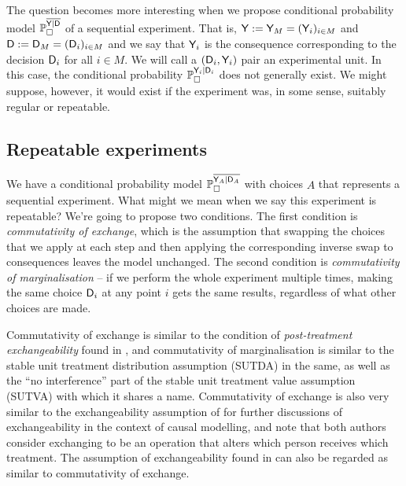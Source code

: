 The question becomes more interesting when we propose conditional probability model $\mathbb{P}_\square^{\overline{\mathsf{Y}|\mathsf{D}}}$ of a sequential experiment. That is, $\mathsf{Y}:=\mathsf{Y}_M=(\mathsf{Y}_i)_{i\in M}$ and $\mathsf{D}:=\mathsf{D}_M=(\mathsf{D}_i)_{i\in M}$ and we say that $\mathsf{Y}_i$ is the consequence corresponding to the decision $\mathsf{D}_i$ for all $i\in M$. We will call a $(\mathsf{D}_i,\mathsf{Y}_i)$ pair an experimental unit. In this case, the conditional probability $\mathbb{P}_\square^{\mathsf{Y}_i|\mathsf{D}_i}$ does not generally exist. We might suppose, however, it would exist if the experiment was, in some sense, suitably regular or repeatable.

\subsection{Repeatable experiments}

We have a conditional probability model $\mathbb{P}_\square^{\overline{\mathsf{Y}_A|\mathsf{D}_A}}$ with choices $A$ that represents a sequential experiment. What might we mean when we say this experiment is repeatable? We're going to propose two conditions. The first condition is \emph{commutativity of exchange}, which is the assumption that swapping the choices that we apply at each step and then applying the corresponding inverse swap to consequences leaves the model unchanged. The second condition is \emph{commutativity of marginalisation} -- if we perform the whole experiment multiple times, making the same choice $\mathsf{D}_i$ at any point $i$ gets the same results, regardless of what other choices are made.

Commutativity of exchange is similar to the condition of \emph{post-treatment exchangeability} found in \citet{dawid_decision-theoretic_2020}, and commutativity of marginalisation is similar to the stable unit treatment distribution assumption (SUTDA) in the same, as well as the ``no interference'' part of the stable unit treatment value assumption (SUTVA) with which it shares a name. Commutativity of exchange is also very similar to the exchangeability assumption of \citet{greenland_identifiability_1986} for further discussions of exchangeability in the context of causal modelling, and note that both authors consider exchanging to be an operation that alters which person receives which treatment. The assumption of exchangeability found in \citet{banerjee_chapter_2017} can also be regarded as similar to commutativity of exchange.


